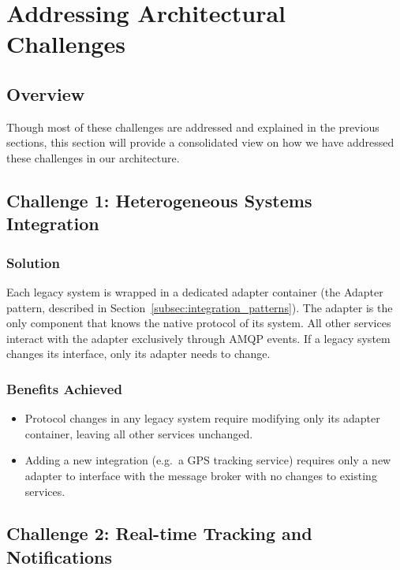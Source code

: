 \section{Addressing Architectural Challenges}
\subsection{Overview}

Though most of these challenges are addressed and explained in the previous sections, this section will provide a consolidated view on how we have addressed these challenges in our architecture.

\subsection{Challenge 1: Heterogeneous Systems Integration}

\subsubsection{Solution}

Each legacy system is wrapped in a dedicated adapter container (the Adapter pattern, described in Section~\ref{subsec:integration_patterns}). The adapter is the only component that knows the native protocol of its system. All other services interact with the adapter exclusively through AMQP events. If a legacy system changes its interface, only its adapter needs to change.

\subsubsection{Benefits Achieved}

\begin{itemize}
    \item Protocol changes in any legacy system require modifying only its adapter container, leaving all other services unchanged.
    \item Adding a new integration (e.g.\ a GPS tracking service) requires only a new adapter to interface with the message broker with no changes to existing services.
\end{itemize} 

\subsection{Challenge 2: Real-time Tracking and Notifications}
\label{subsec:challenge2}

